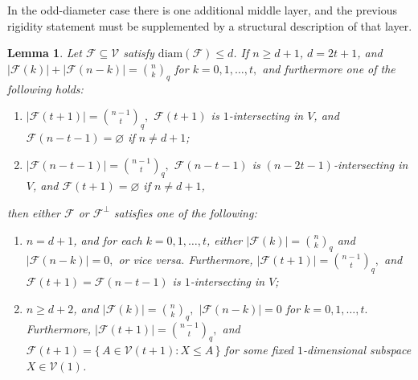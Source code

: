 \documentclass[11pt]{article}
\newtheorem{lemma}[theorem]{Lemma}
\theoremstyle{definition}
\newcommand{\qbinom}[2]{\genfrac{(}{)}{0pt}{}{#1}{#2}_q}
\newcommand{\diam}{\mathrm{diam}}
\begin{document}
In the odd-diameter case there is one additional middle layer, and the previous rigidity statement must be supplemented by a structural description of that layer.

\begin{lemma}\label{lem:equality-odd}
Let \(\mathcal F\subseteq\mathcal V\) satisfy \(\diam(\mathcal F)\le d\).
If $n\ge d+1$, $d=2t+1$, and
\(
|\mathcal{F}(k)|+|\mathcal{F}(n-k)|=\qbinom{n}{k}\)
for \(k=0,1,\ldots,t,\) and furthermore one of the following holds:
\begin{enumerate}
\item[(a)]
\(
|\mathcal{F}(t+1)|=\qbinom{n-1}{t},
\)
$\mathcal{F}(t+1)$ is $1$-intersecting in $V$, and
$\mathcal{F}(n-t-1)=\varnothing$ if $n\neq d+1$;

\item[(b)]
\(
|\mathcal{F}(n-t-1)|=\qbinom{n-1}{t},
\)
$\mathcal{F}(n-t-1)$ is $(n-2t-1)$-intersecting in $V$, and
$\mathcal{F}(t+1)=\varnothing$ if $n\neq d+1$,
\end{enumerate}
then either $\mathcal{F}$ or $\mathcal{F}^\perp$ satisfies one of the following:
\begin{enumerate}
\item[\textup{(1)}]
$n=d+1$, and for each $k=0,1,\ldots,t$, either
\(
|\mathcal{F}(k)|=\qbinom{n}{k}\)
and
\(
|\mathcal{F}(n-k)|=0,
\)
or vice versa. Furthermore,
\(
|\mathcal{F}(t+1)|=\qbinom{n-1}{t},
\)
and
\(
\mathcal{F}(t+1)=\mathcal{F}(n-t-1)
\)
is $1$-intersecting in $V$;

\item[\textup{(2)}]
$n\ge d+2$, and
\(
|\mathcal{F}(k)|=\qbinom{n}{k},\)
\(
|\mathcal{F}(n-k)|=0\)
for \(k=0,1,\ldots,t.\)
Furthermore,
\(
|\mathcal{F}(t+1)|=\qbinom{n-1}{t},
\)
and
\(
\mathcal{F}(t+1)=\{\,A\in \mathcal{V}(t+1): X\le A\,\}
\)
for some fixed $1$-dimensional subspace $X \in \mathcal{V}(1)$.
\end{enumerate}
\end{lemma}
\end{document}
